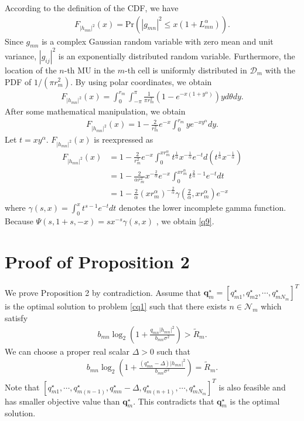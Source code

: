 \documentclass[journal]{IEEEtran}
\begin{document}
According to the definition of the CDF, we have
\begin{align}
F_{\left|h_{mn} \right|^2} \left(x\right)=\mbox{Pr}\left(\left|g_{mn}\right|^2 \leq x \left(1 + L_{mn}^\alpha\right)\right).
\end{align}
Since $g_{mn}$ is a complex Gaussian random variable with zero mean and unit variance,  $\left|g_{ij}\right|^2$ is an exponentially distributed random variable.
Furthermore, the location of the $n$-th MU in the $m$-th cell is uniformly distributed in $\mathcal{D}_m$ with the PDF of $1/(\pi r_m^2)$. By using polar coordinates, we obtain
\begin{align}
F_{\left|h_{mn}\right|^2} \left(x\right)= \int_{0}^{r_m} \int_{-\pi}^{\pi}\frac{1}{\pi r_m^2}\left(1 - e^{-x\left(1 + y^{\alpha}\right)}\right)y d \theta d y.
\end{align}
After some mathematical manipulation, we obtain
\begin{align}
F_{\left|h_{mn}\right|^2} \left(x\right)=1-\frac{2}{r_m^2}e^{-x} \int_{0}^{r_m}y e^{-xy^{\alpha}}dy.
\end{align}
Let $t = xy^{\alpha}$. $F_{\left|h_{mn}\right|^2} \left(x\right)$ is reexpressed as
\begin{align}
F_{\left|h_{mn}\right|^2} \left(x\right) &= 1 - \frac{2}{r_m^2}e^{-x} \int_{0}^{x r_m^{\alpha}} t^{\frac{1}{\alpha}} x^{-\frac{1}{\alpha}}e^{-t} d\left(t^{\frac{1}{\alpha}} x^{-\frac{1}{\alpha}}\right)\nonumber\\
& = 1 - \frac{2}{\alpha r_m^2}x^{-\frac{2}{\alpha}} e^{-x} \int_{0}^{x r_m^{\alpha}} t^{\frac{2}{\alpha} - 1}e^{-t} dt\nonumber\\
& = 1 - \frac{2}{\alpha} \left(x r_m^{\alpha}\right) ^{-\frac{2}{\alpha}} \gamma\left(\frac{2}{\alpha}, x r_m^{\alpha}\right)e^{-x}
\end{align}
where $\gamma\left(s,x\right) = \int_{0}^{x}t^{s-1}e^{-t}dt$ denotes the lower incomplete gamma function. Because $\Psi\left(s,1+s,-x\right)=sx^{-s}\gamma\left(s,x\right)$ \cite[6.5.12]{MAbramowitz}, we obtain \eqref{q9}.

\section{Proof of Proposition 2}

We prove Proposition 2 by contradiction. Assume that $\mathbf{q}_m^\star=[q_{m1}^\star, q_{m2}^\star, \cdots, q_{mN_m}^\star]^T$ is the optimal solution to problem \eqref{cq1} such that there exists $n\in\mathcal{N}_m$ which satisfy
\begin{align}
b_{mn}\log_2\left(1 + \frac{q_{mn}\left|h_{mn}\right|^2}{b_{mn}\sigma^2}\right)>\tilde{R}_m.
\end{align}
We can choose a proper real scalar $\Delta>0$ such that
\begin{align}
b_{mn}\log_2\left(1 + \frac{(q_{mn}^\star-\Delta)\left|h_{mn}\right|^2}{b_{mn}\sigma^2}\right)=\tilde{R}_m.
\end{align}
Note that $[q_{m1}^\star, \cdots, q_{m(n-1)}^\star, q_{mn}^\star-\Delta, q_{m(n+1)}^\star, \cdots, q_{mN_m}^\star]^T$ is also feasible and has smaller objective value than $\mathbf{q}_m^\star$. This contradicts that $\mathbf{q}_m^\star$ is the optimal solution.
\end{document}
